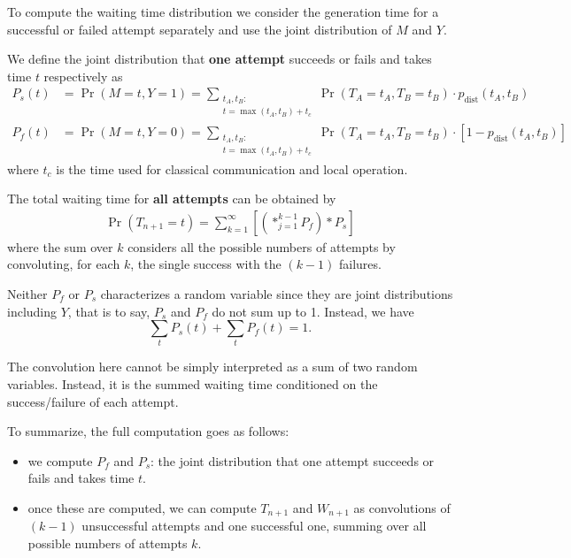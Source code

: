 \documentclass{masterthesis}
\begin{document}
To compute the waiting time distribution we consider the generation time for a successful or failed attempt separately and use the joint distribution of $M$ and $Y$.

We define the joint distribution that \textbf{one attempt} succeeds or fails and takes time $t$ respectively as
\begin{align}\label{eq:waiting_time_success_failure}
    P_s(t) &= \Pr(M = t, Y = 1) = \sum_{\substack{t_A, t_B : \\ t = \max(t_A, t_B) + t_c}} \Pr(T_A = t_A, T_B = t_B) \cdot p_\text{dist}(t_A, t_B) \\
    P_f(t) &= \Pr(M = t, Y = 0) = \sum_{\substack{t_A, t_B : \\ t = \max(t_A, t_B) + t_c}} \Pr(T_A = t_A, T_B = t_B) \cdot [1 - p_\text{dist}(t_A, t_B)]
\end{align}
where $t_c$ is the time used for classical communication and local operation. %

The total waiting time for \textbf{all attempts} can be obtained by
\begin{align}\label{eq:waiting_time_distillation}
    \Pr(T_{n+1} = t) = \sum_{k=1}^{\infty} \left[ \left( \ast_{j=1}^{k-1} P_f \right) \ast P_s \right]
\end{align}
where the sum over $k$ considers all the possible numbers of attempts by convoluting, for each $k$, the single success with the $(k-1)$ failures.

Neither $P_f$ or $P_s$ characterizes a random variable since they are joint distributions including $Y$, that is to say, $P_s$ and $P_f$ do not sum up to 1. Instead, we have
\begin{equation}
    \sum_t P_s(t) + \sum_t P_f(t) = 1 .
\end{equation}

The convolution here cannot be simply interpreted as a sum of two random variables. Instead, it is the summed waiting time conditioned on the success/failure of each attempt.

To summarize, the full computation goes as follows:
\begin{itemize}
    \item we compute $P_f$ and $P_s$: the joint distribution that one attempt succeeds or fails and takes time $t$.
    \item once these are computed, we can compute $T_{n+1}$ and $W_{n+1}$ as convolutions of $(k-1)$ unsuccessful attempts and one successful one, summing over all possible numbers of attempts $k$.
\end{itemize}
\end{document}
